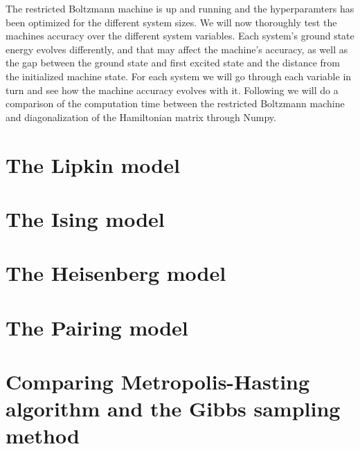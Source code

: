 The restricted Boltzmann machine is up and running and the hyperparamters has been optimized for the different system sizes. We will now thoroughly test the machines accuracy over the different system variables. Each system's ground state energy evolves differently, and that may affect the machine's accuracy, as well as the gap between the ground state and first excited state and the distance from the initialized machine state. For each system we will go through each variable in turn and see how the machine accuracy evolves with it. Following we will do a comparison of the computation time between the restricted Boltzmann machine and diagonalization of the Hamiltonian matrix through Numpy\cite{harris2020array}.

\chapter{The Lipkin model}

\chapter{The Ising model}

\chapter{The Heisenberg model}

\chapter{The Pairing model}

\chapter{Comparing Metropolis-Hasting algorithm and the Gibbs sampling method}


